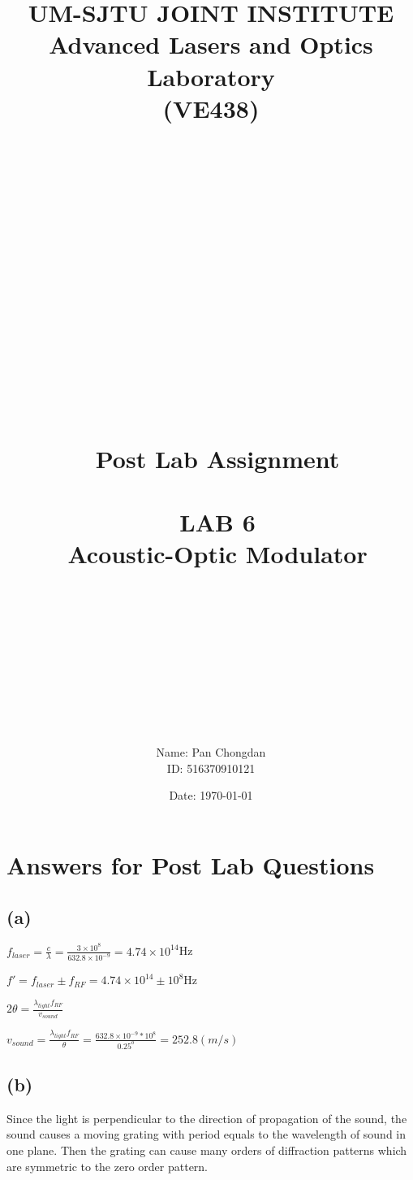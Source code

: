 \documentclass[12pt]{article}
\title{\large UM-SJTU JOINT INSTITUTE\\Advanced Lasers and Optics Laboratory\\(VE438)\\\ \\\ \\\ \\\ \\\ \\\ \\\ \\\ \\\ \\\ \\\
Post Lab Assignment\\\ \\\ LAB 6\\\ Acoustic-Optic Modulator \\\ \\\ \\\ \\\ \\\ }
\author{Name: Pan Chongdan \\ID: 516370910121}
\date{Date: \today}
\begin{document}
\maketitle
\newpage
\section{Answers for Post Lab Questions}
\subsection{(a)}
$f_{laser}=\frac{c}{\lambda}=\frac{3\times10^8}{632.8\times10^{-9}}=4.74\times10^{14}$Hz
\par $f'=f_{laser}\pm f_{RF}=4.74\times10^{14}\pm10^{8}$Hz
\par $2\theta=\frac{\lambda_{light}f_{RF}}{v_{sound}}$
\par$v_{sound}=\frac{\lambda_{light}f_{RF}}{\theta}=\frac{632.8\times10^{-9}*10^{8}}{0.25^o}=252.8(m/s)$
\subsection{(b)}
Since the light is perpendicular to the direction of propagation of the sound, the sound causes a moving grating with period equals to the wavelength of sound in one plane. Then the grating can cause many orders of diffraction patterns which are symmetric to the zero order pattern.
\end{document}
